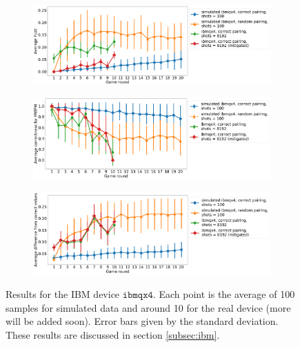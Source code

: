 \documentclass[aps,prl,twocolumn,showpacs,preprintnumbers]{revtex4-1}
\begin{document}
\begin{figure}
    \centering
    \begin{subfigure}[b]{\textwidth}
        \includegraphics[width=\textwidth]{figures/ibmqx4_fuzz.png}
    \end{subfigure}
    \begin{subfigure}[b]{\textwidth}
        \includegraphics[width=\textwidth]{figures/ibmqx4_mwpm.png}
    \end{subfigure}
    \begin{subfigure}[b]{\textwidth}
        \includegraphics[width=\textwidth]{figures/ibmqx4_diff.png}
    \end{subfigure}
    \caption{Results for the IBM device $\mathtt{ibmqx4}$. Each point is the average of 100 samples for simulated data and around 10 for the real device (more will be added soon). Error bars given by the standard deviation. These results are discussed in section \ref{subsec:ibm}.}\label{fig:ibmqx4}
\end{figure}
\pagebreak
\end{document}
